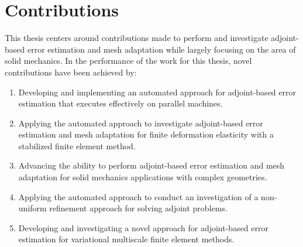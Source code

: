 \section{Contributions}

This thesis centers around contributions made to
perform and investigate adjoint-based error estimation and mesh
adaptation while largely focusing on the area of solid mechanics.
In the performance of the work for this thesis, novel contributions
have been achieved by:
%
\begin{enumerate}
\item Developing and implementing an automated approach
for adjoint-based error estimation that executes effectively
on parallel machines.
\item Applying the automated approach to investigate
adjoint-based error estimation and mesh adaptation for finite
deformation elasticity with a stabilized finite element method.
\item Advancing the ability to perform adjoint-based error
estimation and mesh adaptation for solid mechanics applications
with complex geometries.
\item Applying the automated approach to conduct an investigation
of a non-uniform refinement approach for solving adjoint problems.
\item Developing and investigating a novel approach for adjoint-based error
estimation for variational multiscale finite element methods.
\end{enumerate}
